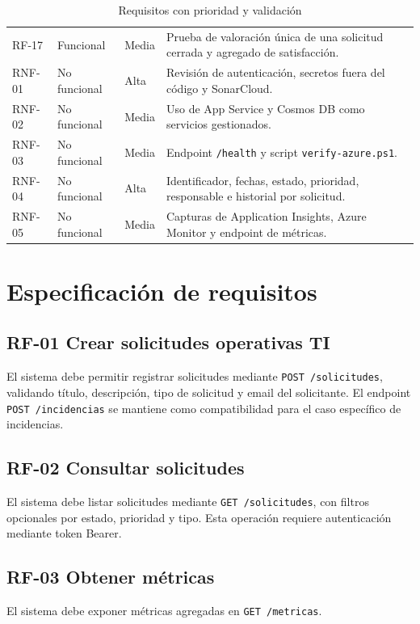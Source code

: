 \begin{table}[h]
\begin{tabularx}{\textwidth}{l l l X}
RF-17 & Funcional & Media & Prueba de valoración única de una solicitud cerrada y agregado de satisfacción. \\
RNF-01 & No funcional & Alta & Revisión de autenticación, secretos fuera del código y SonarCloud. \\
RNF-02 & No funcional & Media & Uso de App Service y Cosmos DB como servicios gestionados. \\
RNF-03 & No funcional & Media & Endpoint \texttt{/health} y script \texttt{verify-azure.ps1}. \\
RNF-04 & No funcional & Alta & Identificador, fechas, estado, prioridad, responsable e historial por solicitud. \\
RNF-05 & No funcional & Media & Capturas de Application Insights, Azure Monitor y endpoint de métricas. \\
\end{tabularx}
\caption{Requisitos con prioridad y validación}
\label{tabla:requisitos_prioridad_validacion}
\end{table}

\section{Especificación de requisitos}

\subsection{RF-01 Crear solicitudes operativas TI}
\begin{sloppypar}
El sistema debe permitir registrar solicitudes mediante \texttt{POST /solicitudes}, validando título, descripción, tipo de solicitud y email del solicitante. El endpoint \texttt{POST /incidencias} se mantiene como compatibilidad para el caso específico de incidencias.
\end{sloppypar}

\subsection{RF-02 Consultar solicitudes}
El sistema debe listar solicitudes mediante \texttt{GET /solicitudes}, con filtros opcionales por estado, prioridad y tipo. Esta operación requiere autenticación mediante token Bearer.

\subsection{RF-03 Obtener métricas}
El sistema debe exponer métricas agregadas en \texttt{GET /metricas}.

